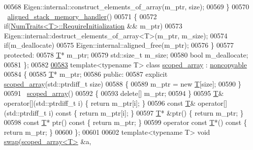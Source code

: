 \begin{DoxyCode}
00568         Eigen::internal::construct\_elements\_of\_array(m\_ptr, size);
00569     \}
00570     ~\hyperlink{class_eigen_1_1internal_1_1aligned__stack__memory__handler}{aligned\_stack\_memory\_handler}()
00571     \{
00572       \textcolor{keywordflow}{if}(\hyperlink{group___core___module_struct_eigen_1_1_num_traits}{NumTraits<T>::RequireInitialization} && m\_ptr)
00573         Eigen::internal::destruct\_elements\_of\_array<T>(m\_ptr, m\_size);
00574       \textcolor{keywordflow}{if}(m\_deallocate)
00575         Eigen::internal::aligned\_free(m\_ptr);
00576     \}
00577   \textcolor{keyword}{protected}:
00578     \hyperlink{group___sparse_core___module}{T}* m\_ptr;
00579     std::size\_t m\_size;
00580     \textcolor{keywordtype}{bool} m\_deallocate;
00581 \};
00582 
\hyperlink{class_eigen_1_1internal_1_1scoped__array}{00583} \textcolor{keyword}{template}<\textcolor{keyword}{typename} T> \textcolor{keyword}{class }\hyperlink{class_eigen_1_1internal_1_1scoped__array}{scoped\_array} : \hyperlink{class_eigen_1_1internal_1_1noncopyable}{noncopyable}
00584 \{
00585   \hyperlink{group___sparse_core___module}{T}* m\_ptr;
00586 \textcolor{keyword}{public}:
00587   \textcolor{keyword}{explicit} \hyperlink{class_eigen_1_1internal_1_1scoped__array}{scoped\_array}(std::ptrdiff\_t size)
00588   \{
00589     m\_ptr = \textcolor{keyword}{new} \hyperlink{group___sparse_core___module}{T}[size];
00590   \}
00591   ~\hyperlink{class_eigen_1_1internal_1_1scoped__array}{scoped\_array}()
00592   \{
00593     \textcolor{keyword}{delete}[] m\_ptr;
00594   \}
00595   \hyperlink{group___sparse_core___module}{T}& operator[](std::ptrdiff\_t i) \{ \textcolor{keywordflow}{return} m\_ptr[i]; \}
00596   \textcolor{keyword}{const} \hyperlink{group___sparse_core___module}{T}& operator[](std::ptrdiff\_t i)\textcolor{keyword}{ const }\{ \textcolor{keywordflow}{return} m\_ptr[i]; \}
00597   \hyperlink{group___sparse_core___module}{T}* &ptr() \{ \textcolor{keywordflow}{return} m\_ptr; \}
00598   \textcolor{keyword}{const} \hyperlink{group___sparse_core___module}{T}* ptr()\textcolor{keyword}{ const }\{ \textcolor{keywordflow}{return} m\_ptr; \}
00599   \textcolor{keyword}{operator} \textcolor{keyword}{const} \hyperlink{group___sparse_core___module}{T}*() \textcolor{keyword}{const} \{ \textcolor{keywordflow}{return} m\_ptr; \}
00600 \};
00601 
00602 \textcolor{keyword}{template}<\textcolor{keyword}{typename} T> \textcolor{keywordtype}{void} \hyperlink{endian_8c_a3ca5ecd34b04d6a243c054ac3a57f68d}{swap}(\hyperlink{class_eigen_1_1internal_1_1scoped__array}{scoped\_array<T>} &a,

\end{DoxyCode}
